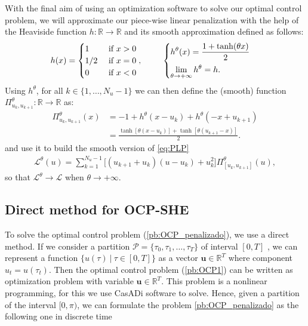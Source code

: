 \documentclass[twocolumn]{autart}    %
\begin{document}
With the final aim of using an optimization software to solve our optimal control problem, we will approximate our piece-wise linear penalization with the help of the Heaviside function $h:\mathbb{R} \rightarrow \mathbb{R}$ and its smooth approximation defined as follows: 
\begin{align*}
    h(x) = \begin{cases}
        1 & \text{ if } x > 0 \\
		1/2 & \text{ if } x = 0\\
		 0 & \text{ if } x < 0
    \end{cases},    
    \hspace{2.5em} 
    \begin{cases}
        \displaystyle h^\theta(x) = \frac{1 + \tanh(\theta x)}{2} \\[7pt] \displaystyle \lim_{\theta\to +\infty} h^\theta = h.
    \end{cases}
\end{align*}
Using $h^\theta$, for all $k \in \{1,\dots,N_u-1\}$ we can then define the (smooth) function $\Pi_{u_k,u_{k+1}}^\theta:\mathbb{R} \rightarrow \mathbb{R}$ as:
\begin{align*}
    \Pi_{u_k,u_{k+1}}^\theta(x) &= - 1 + h^\theta(x-u_k) + h^\theta(-x+u_{k+1}) 
    \\[5pt]
    &= \frac{\tanh[\theta(x-u_k)] + \tanh[\theta (u_{k+1}-x)]}{2}.
\end{align*}
and use it to build the smooth version of \eqref{eq:PLP}
\begin{align*}
    \mathcal{L}^\theta(u) = \sum_{k = 1}^{N_u-1} \Big[ (u_{k+1}+u_{k}) (u-u_k) + u_k^2 \Big] \Pi^\theta_{[u_k,u_{k+1}]}(u),
\end{align*}
so that $\mathcal{L}^\theta \rightarrow \mathcal{L}$ when $\theta \rightarrow +\infty$. 

\subsection{Direct method  for  OCP-SHE}

To solve the optimal control problem (\ref{pb:OCP_penalizado}), we use a direct method. 
%
If we consider a partition $\mathcal{P} = \{\tau_0,\tau_1,\dots,\tau_{T}\}$ of interval $[0,T]$ , we can represent a function $\{ u(\tau) \ | \ \tau \in [0,T]\}$ as a vector $\bm{u} \in \mathbb{R}^{T}$ where component $u_t = u(\tau_t)$.  
%
Then the optimal control problem (\ref{pb:OCP1}) can be written as optimization problem with variable $\bm{u} \in \mathbb{R}^{T}$. This problem is a nonlinear programming, for this we use CasADi software to solve. 
%
Hence, given a partition of the interval $[0,\pi)$, we can formulate the problem \ref{pb:OCP_penalizado} as the following one in discrete time
\newline
\end{document}
